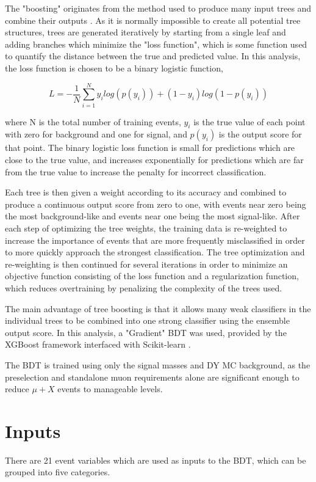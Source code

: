 The "boosting" originates from the method used to produce many input trees and combine their outputs \cite{GradBoost}. 
As it is normally impossible to create all potential tree structures, trees are generated iteratively by starting from a single leaf and adding branches which minimize the "loss function", which is some function used to quantify the distance between the true and predicted value.
In this analysis, the loss function is chosen to be a binary logistic function,

\begin{equation}
	\label{binLogFunc}
	L = - \frac{1}{N} \sum_{i=1}^{N} y_i log(p(y_i)) + (1-y_i) log(1-p(y_i))
\end{equation} 

where N is the total number of training events, $y_i$ is the true value of each point with zero for background and one for signal, and $p(y_i)$ is the output score for that point.
The binary logistic loss function is small for predictions which are close to the true value, and increases exponentially for predictions which are far from the true value to increase the penalty for incorrect classification.

Each tree is then given a weight according to its accuracy and combined to produce a continuous output score from zero to one, with events near zero being the most background-like and events near one being the most signal-like. 
After each step of optimizing the tree weights, the training data is re-weighted to increase the importance of events that are more frequently misclassified in order to more quickly approach the strongest classification.
The tree optimization and re-weighting is then continued for several iterations in order to minimize an objective function consisting of the loss function and a regularization function, which reduces overtraining by penalizing the complexity of the trees used.

The main advantage of tree boosting is that it allows many weak classifiers in the individual trees to be combined into one strong classifier using the ensemble output score.
In this analysis, a "Gradient" BDT was used, provided by the XGBoost framework \cite{XGBoost} interfaced with Scikit-learn \cite{scikit}. 

The BDT is trained using only the signal masses and DY MC background, as the preselection and standalone muon requirements alone are significant enough to reduce $\mu+X$ events to manageable levels. 

\section{Inputs}
There are 21 event variables which are used as inputs to the BDT, which can be grouped into five categories.

